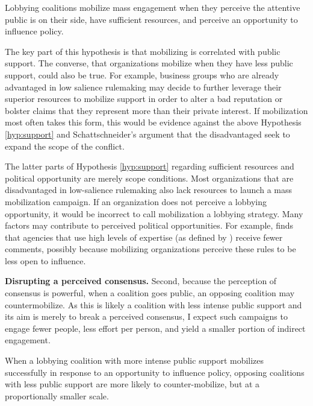 \begin{subhyp}

\begin{hyp} \label{hyp:support}
Lobbying coalitions mobilize mass engagement when they perceive the attentive public is on their side, have sufficient resources, and perceive an opportunity to influence policy.
\end{hyp}

The key part of this hypothesis is that mobilizing is correlated with public support. The converse, that organizations mobilize when they have less public support, could also be true. For example, business groups who are already advantaged in low salience rulemaking may decide to further leverage their superior resources to mobilize support in order to alter a bad reputation or bolster claims that they represent more than their private interest. If mobilization most often takes this form, this would be evidence against the above Hypothesis \ref{hyp:support} and Schattschneider's argument that the disadvantaged seek to expand the scope of the conflict. 

The latter parts of Hypothesis \ref{hyp:support} regarding sufficient resources and political opportunity are merely scope conditions. Most organizations that are disadvantaged in low-salience rulemaking also lack resources to launch a mass mobilization campaign. If an organization does not perceive a lobbying opportunity, it would be incorrect to call mobilization a lobbying strategy. Many factors may contribute to perceived political opportunities. For example, \citet{Moore2017} finds that agencies that use high levels of expertise (as defined by \citet{Selin2015}) receive fewer comments, possibly because mobilizing organizations perceive these rules to be less open to influence. 

\textbf{Disrupting a perceived consensus.} Second, because the perception of consensus is powerful, when a coalition goes public, an opposing coalition may countermobilize. As this is likely a coalition with less intense public support and its aim is merely to break a perceived consensus, I expect such campaigns to engage fewer people, less effort per person, and yield a smaller portion of indirect engagement. 


\begin{hyp}
When a lobbying coalition with more intense public support mobilizes successfully in response to an opportunity to influence policy, opposing coalitions with less public support are more likely to counter-mobilize, but at a proportionally smaller scale.
\end{hyp}


\end{subhyp}
